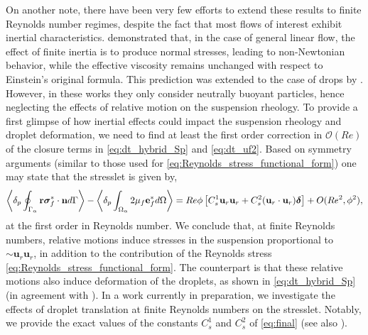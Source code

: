 On another note, there have been very few efforts to extend these results to finite Reynolds number regimes, despite the fact that most flows of interest exhibit inertial characteristics. 
\citet{stone2001inertial} demonstrated that, in the case of general linear flow, the effect of finite inertia is to produce normal stresses, leading to non-Newtonian behavior, while the effective viscosity remains unchanged with respect to Einstein's original formula. 
This prediction was extended to the case of drops by \citet{raja2010inertial}. 
However, in these works they only consider neutrally buoyant particles, hence neglecting the effects of relative motion on the suspension rheology. 
To provide a first glimpse of how inertial effects could impact the suspension rheology and droplet deformation, we need to find at least the first order correction in $\mathcal{O}(Re)$ of the closure terms in \ref{eq:dt_hybrid_Sp} and \ref{eq:dt_uf2}. 
Based on symmetry arguments (similar to those used for \ref{eq:Reynolds_stress_functional_form}) one may state that the stresslet is given by, 
\begin{equation}
    \pSavg{\textbf{r}\bm\sigma^*_f\cdot \textbf{n}}
    -\pOavg{2\mu_f\textbf{e}^*_f}
    =
    Re \phi 
    \left[
       C_s^1 \textbf{u}_{r}\textbf{u}_{r} 
    +  C_s^2 (\textbf{u}_{r}\cdot \textbf{u}_{r})\bm\delta
    \right]
    + O(Re^2,\phi^2),
    \label{eq:final}
\end{equation}
at the first order in Reynolds number. 
We conclude that, at finite Reynolds numbers, relative motions induce stresses in the suspension proportional to $\sim \textbf{u}_r\textbf{u}_r$, in addition to the contribution of the Reynolds stress \eqref{eq:Reynolds_stress_functional_form}. 
The counterpart is that these relative motions also induce deformation of the droplets, as shown in \eqref{eq:dt_hybrid_Sp} (in agreement with \citet{taylor1964deformation}).
In a work currently in preparation, we investigate the effects of droplet translation at finite Reynolds numbers on the stresslet. 
Notably, we provide the exact values of the constants $C_s^{1}$ and $C_s^{2}$ of \ref{eq:final} (see also \citet{fintzi2025}). 
 

